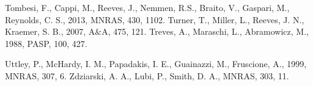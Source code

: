 \documentclass[useAMS,usenatbib]{sam}
\begin{document}
\begin{thebibliography}{99}
     Tombesi, F., Cappi, M., Reeves, J., Nemmen, R.S., Braito, V., Gaspari, M., Reynolds, C. S., 2013,
MNRAS, 430, 1102.
     Turner, T., Miller, L., Reeves, J. N., Kraemer, S. B., 2007, A\&A, 475, 121.
     Treves, A., Maraschi, L., Abramowicz, M., 1988, PASP, 100, 427.
    
     Uttley, P., McHardy, I. M., Papadakis, I. E., Guainazzi, M., Fruscione, A., 1999, MNRAS, 307, 6.
     Zdziarski, A. A., Lubi, P., Smith, D. A., MNRAS, 303, 11.
    
\end{thebibliography}

\label{lastpage}
\end{document}
